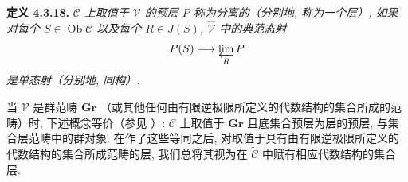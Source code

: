 \medskip
\noindent{}\textbf{定义 4.3.18.}
\textit{\(\mathscr C\) 上取值于 \(\mathscr V\) 的预层 \(P\)
称为\emph{分离的}（分别地, 称为一个\emph{层}）, 如果对每个
\(S\in\operatorname{Ob}\mathscr C\) 以及每个 \(R\in J(S)\),
\(\widehat{\mathscr V}\) 中的典范态射}
\[
 P(S)\longrightarrow\varprojlim_RP
\]
\textit{是单态射（分别地, 同构）.}

当 \(\mathscr V\) 是群范畴 \(\mathbf{Gr}\)
（或其他任何由有限逆极限所定义的代数结构的集合所成的范畴）时,
下述概念等价（参见 ）:
\(\mathscr C\) 上取值于 \(\mathbf{Gr}\) 且底集合预层为层的预层,
与集合层范畴中的群对象.
在作了这些等同之后, 对取值于具有由有限逆极限所定义的代数结构的集合所成范畴的层,
我们总将其视为在 \(\widetilde{\mathscr C}\) 中赋有相应代数结构的集合层.

